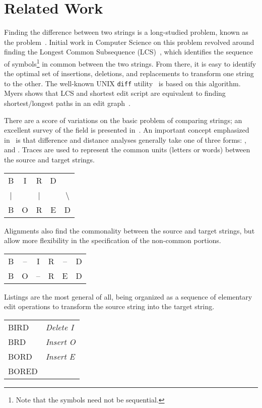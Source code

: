 \section{Related Work}
\label{sec:diff-related}

Finding the difference between two strings is a long-studied problem,
known as the  problem~\cite{Wagner1974}.
Initial work in Computer Science on this problem revolved around finding the
Longest Common Subsequence (LCS)~\cite{Gusfield1999}, which identifies the
sequence of symbols\footnote{Note that the symbols need not be sequential.}
in common between the two strings.
From there, it is easy to identify the optimal
set of insertions, deletions, and replacements to transform
one string to the other.
The well-known UNIX \texttt{diff} utility~\cite{Hunt1976} is based
on this algorithm.
Myers shows that LCS and shortest edit script are equivalent to finding
shortest/longest paths in an edit graph~\cite{Myers1986}.

There are a score of variations on the basic problem of
comparing strings; an excellent survey of the field is
presented in~\cite{Sankoff1999}.
An important concept emphasized in~\cite{Sankoff1999} is that
difference and distance analyses generally take one of
three forms: ,  and .
Traces are used to represent the common units (\eg letters or words)
between the source and target strings.
\begin{center}
  \begin{tabular}{c c c c c}
B & I & R & D & \\
| &   & | &   & $\!\!\!\!\!\!\!\!\!\!$\textbackslash \\
B & O & R & E & D \\
  \end{tabular}
\end{center}
Alignments also find the commonality between the source and target
strings, but allow more flexibility in the specification of
the non-common portions.
\begin{center}
  \begin{tabular}{c c c c c c}
B & -- & I & R & -- & D \\
B & O & -- & R & E & D \\
  \end{tabular}
\end{center}
Listings are the most general of all, being
organized as a sequence of elementary edit operations
to transform the source string into the target string.
\begin{center}
  \begin{tabular}{l l}
  BIRD & \textit{Delete I} \\
  BRD & \textit{Insert O} \\
  BORD & \textit{Insert E} \\
  BORED & \\
  \end{tabular}
\end{center}


